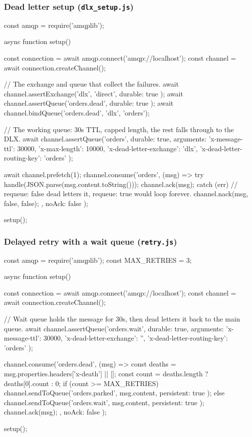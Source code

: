 \documentclass[11pt,a4paper]{article}
\begin{document}
\subsubsection*{Dead letter setup (\texttt{dlx\_setup.js})}
\begin{js}[basicstyle=\ttfamily\scriptsize]
const amqp = require('amqplib');

async function setup() {
    const connection = await amqp.connect('amqp://localhost');
    const channel = await connection.createChannel();

    // The exchange and queue that collect the failures.
    await channel.assertExchange('dlx', 'direct', { durable: true });
    await channel.assertQueue('orders.dead', { durable: true });
    await channel.bindQueue('orders.dead', 'dlx', 'orders');

    // The working queue: 30s TTL, capped length, the rest falls through to the DLX.
    await channel.assertQueue('orders', {
        durable: true,
        arguments: {
            'x-message-ttl': 30000,
            'x-max-length': 10000,
            'x-dead-letter-exchange': 'dlx',
            'x-dead-letter-routing-key': 'orders'
        }
    });

    await channel.prefetch(1);
    channel.consume('orders', (msg) => {
        try {
            handle(JSON.parse(msg.content.toString()));
            channel.ack(msg);
        } catch (err) {
            // requeue: false dead letters it, requeue: true would loop forever.
            channel.nack(msg, false, false);
        }
    }, { noAck: false });
}
setup();
\end{js}

\subsubsection*{Delayed retry with a wait queue (\texttt{retry.js})}
\begin{js}[basicstyle=\ttfamily\scriptsize]
const amqp = require('amqplib');
const MAX_RETRIES = 3;

async function setup() {
    const connection = await amqp.connect('amqp://localhost');
    const channel = await connection.createChannel();

    // Wait queue holds the message for 30s, then dead letters it back to the main queue.
    await channel.assertQueue('orders.wait', {
        durable: true,
        arguments: {
            'x-message-ttl': 30000,
            'x-dead-letter-exchange': '',
            'x-dead-letter-routing-key': 'orders'
        }
    });

    channel.consume('orders.dead', (msg) => {
        const deaths = msg.properties.headers['x-death'] || [];
        const count = deaths.length ? deaths[0].count : 0;
        if (count >= MAX_RETRIES) {
            channel.sendToQueue('orders.parked', msg.content, { persistent: true });
        } else {
            channel.sendToQueue('orders.wait', msg.content, { persistent: true });
        }
        channel.ack(msg);
    }, { noAck: false });
}
setup();
\end{js}
\end{document}
